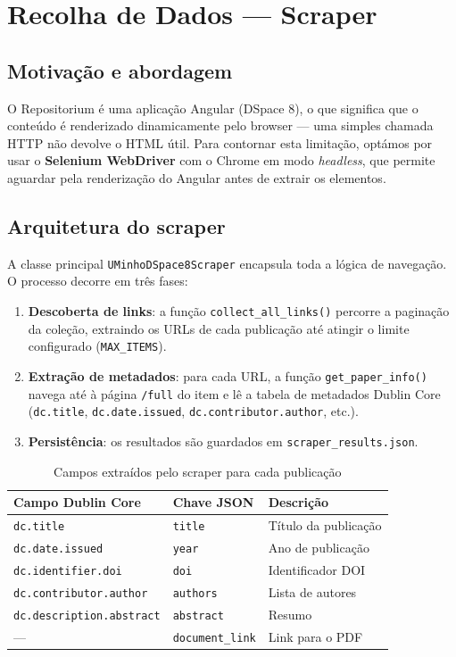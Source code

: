 \documentclass[12pt,a4paper]{article}
\begin{document}
\section{Recolha de Dados --- Scraper}

\subsection{Motivação e abordagem}

O Repositorium é uma aplicação Angular (DSpace 8), o que significa que o conteúdo é renderizado dinamicamente pelo browser --- uma simples chamada HTTP não devolve o HTML útil. Para contornar esta limitação, optámos por usar o \textbf{Selenium WebDriver} com o Chrome em modo \emph{headless}, que permite aguardar pela renderização do Angular antes de extrair os elementos.

\subsection{Arquitetura do scraper}

A classe principal \texttt{UMinhoDSpace8Scraper} encapsula toda a lógica de navegação. O processo decorre em três fases:

\begin{enumerate}
    \item \textbf{Descoberta de links}: a função \texttt{collect\_all\_links()} percorre a paginação da coleção, extraindo os URLs de cada publicação até atingir o limite configurado (\texttt{MAX\_ITEMS}).
    \item \textbf{Extração de metadados}: para cada URL, a função \texttt{get\_paper\_info()} navega até à página \texttt{/full} do item e lê a tabela de metadados Dublin Core (\texttt{dc.title}, \texttt{dc.date.issued}, \texttt{dc.contributor.author}, etc.).
    \item \textbf{Persistência}: os resultados são guardados em \texttt{scraper\_results.json}.
\end{enumerate}

\begin{table}[H]
\centering
\caption{Campos extraídos pelo scraper para cada publicação}
\begin{tabular}{@{}lll@{}}
\toprule
\textbf{Campo Dublin Core} & \textbf{Chave JSON} & \textbf{Descrição} \\
\midrule
\texttt{dc.title}               & \texttt{title}         & Título da publicação \\
\texttt{dc.date.issued}         & \texttt{year}          & Ano de publicação \\
\texttt{dc.identifier.doi}      & \texttt{doi}           & Identificador DOI \\
\texttt{dc.contributor.author}  & \texttt{authors}       & Lista de autores \\
\texttt{dc.description.abstract}& \texttt{abstract}      & Resumo \\
---                             & \texttt{document\_link}& Link para o PDF \\
\bottomrule
\end{tabular}
\end{table}
\end{document}
